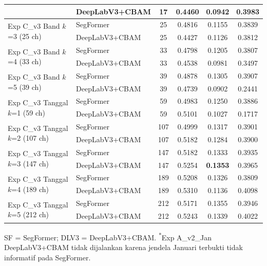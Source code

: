 \begin{table}[H]
{\begin{tabular}{|l|l|c|c|c|c|}
                                                   & DeepLabV3+CBAM & 17 & 0.4460 & 0.0942 & 0.3983 \\
    \hline
    \multirow{2}{*}{Exp C\_v3 Band $k$=3 (25 ch)} & SegFormer     & 25 & 0.4816 & 0.1155 & 0.3839 \\
                                                   & DeepLabV3+CBAM & 25 & 0.4427 & 0.1126 & 0.3812 \\
    \hline
    \multirow{2}{*}{Exp C\_v3 Band $k$=4 (33 ch)} & SegFormer     & 33 & 0.4798 & 0.1205 & 0.3807 \\
                                                   & DeepLabV3+CBAM & 33 & 0.4538 & 0.0981 & 0.3497 \\
    \hline
    \multirow{2}{*}{Exp C\_v3 Band $k$=5 (39 ch)} & SegFormer     & 39 & 0.4878 & 0.1305 & 0.3907 \\
                                                   & DeepLabV3+CBAM & 39 & 0.4739 & 0.0902 & 0.2441 \\
    \hline
    \multirow{2}{*}{Exp C\_v3 Tanggal $k$=1 (59 ch)} & SegFormer  & 59 & 0.4983 & 0.1250 & 0.3886 \\
                                                      & DeepLabV3+CBAM & 59 & 0.5101 & 0.1027 & 0.1717 \\
    \hline
    \multirow{2}{*}{Exp C\_v3 Tanggal $k$=2 (107 ch)} & SegFormer & 107 & 0.4999 & 0.1317 & 0.3901 \\
                                                       & DeepLabV3+CBAM & 107 & 0.5182 & 0.1284 & 0.3900 \\
    \hline
    \multirow{2}{*}{Exp C\_v3 Tanggal $k$=3 (147 ch)} & SegFormer & 147 & 0.5182 & 0.1333 & 0.3935 \\
                                                       & DeepLabV3+CBAM & 147 & 0.5254 & \textbf{0.1353} & 0.3965 \\
    \hline
    \multirow{2}{*}{Exp C\_v3 Tanggal $k$=4 (189 ch)} & SegFormer & 189 & 0.5208 & 0.1326 & 0.3809 \\
                                                       & DeepLabV3+CBAM & 189 & 0.5310 & 0.1136 & 0.4098 \\
    \hline
    \multirow{2}{*}{Exp C\_v3 Tanggal $k$=5 (212 ch)} & SegFormer & 212 & 0.5171 & 0.1355 & 0.3946 \\
                                                       & DeepLabV3+CBAM & 212 & 0.5243 & 0.1339 & 0.4022 \\
    \hline
    \end{tabular}%
    }
    \par\smallskip
    {\footnotesize SF = SegFormer; DLV3 = DeepLabV3+CBAM. \textsuperscript{*}Exp A\_v2\_Jan DeepLabV3+CBAM tidak dijalankan karena jendela Januari terbukti tidak informatif pada SegFormer.}
\end{table}

